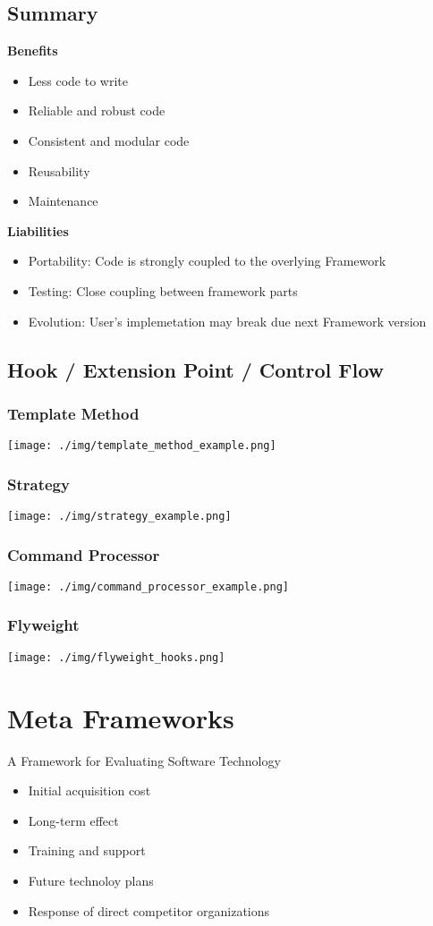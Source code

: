 \subsection{Summary}
\textbf{Benefits}
\begin{itemize}
    \item Less code to write
    \item Reliable and robust code
    \item Consistent and modular code
    \item Reusability
    \item Maintenance
\end{itemize}
\textbf{Liabilities}
\begin{itemize}
    \item Portability: Code is strongly coupled to the overlying Framework 
    \item Testing: Close coupling between framework parts
    \item Evolution: User's implemetation may break due next Framework version
\end{itemize}

\subsection{Hook / Extension Point / Control Flow}
\subsubsection{Template Method}
\texttt{[image: ./img/template\_method\_example.png]}
\subsubsection{Strategy}
\texttt{[image: ./img/strategy\_example.png]}
\subsubsection{Command Processor}
\texttt{[image: ./img/command\_processor\_example.png]}
\subsubsection{Flyweight}
\texttt{[image: ./img/flyweight\_hooks.png]}



\section{Meta Frameworks}
A Framework for Evaluating Software Technology
\begin{itemize}
    \item Initial acquisition cost
    \item Long-term effect
    \item Training and support
    \item Future technoloy plans
    \item Response of direct competitor organizations
\end{itemize}

